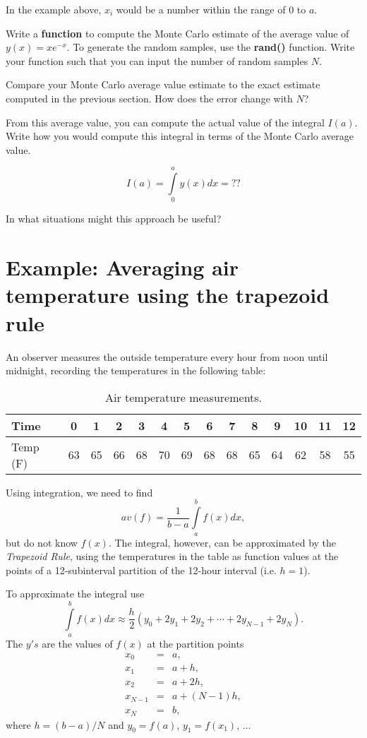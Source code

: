\documentclass[10pt,fleqn]{article}
\begin{document}
In the example above, $x_i$ would be a number within the range of 0 to $a$.

Write a \textbf{function} to compute the Monte Carlo estimate of the average value of $y(x)=xe^{-x}$. To generate the random samples, use the \textbf{rand()} function. Write your function such that you can input the number of random samples $N$.

Compare your Monte Carlo average value estimate to the exact estimate computed in the previous section. How does the error change with $N$?

From this average value, you can compute the actual value of the integral $I(a)$. Write how you would compute this integral in terms of the Monte Carlo average value.

$$I(a) = \int\limits_0^a y(x) dx = ??$$

In what situations might this approach be useful?

\section*{Example: Averaging air temperature using the trapezoid rule}

An observer measures the outside temperature every hour from noon until midnight, recording the temperatures in the following table:

\begin{table}[bh]
	\centering
	\begin{tabular}{l|ccccccccccccc} \hline
	Time & 0 & 1 & 2 & 3 & 4 & 5 & 6 & 7 & 8 & 9 & 10 & 11 & 12 \\ \hline
	Temp (F) & 63 & 65 & 66 & 68 & 70 & 69 & 68 & 68 & 65 & 64 & 62 & 58 & 55 \\ \hline
	\end{tabular}
	\caption{Air temperature measurements.}
	\label{tab:airtemp}
\end{table}

Using integration, we need to find $$av(f) = \frac{1}{b-a} \int \limits_a^b f(x) dx,$$ but do not know $f(x)$. The integral, however, can be approximated by the \textit{Trapezoid Rule}, using the temperatures in the table as function values at the points of a 12-subinterval partition of the 12-hour interval (i.e. $h=1$).

To approximate the integral use $$\int \limits_a^b f(x) dx \approx \frac{h}{2}\left(y_0 + 2y_1 + 2y_2 + \cdots + 2y_{N-1} + 2y_N \right).$$ The $y's$ are the values of $f(x)$ at the partition points
\begin{eqnarray} \nonumber
x_0 &=& a, \\ \nonumber
x_1 &=& a+h, \\ \nonumber
x_2 &=& a+2h, \\ \nonumber
x_{N-1} &=& a+(N-1)h, \\ \nonumber
x_{N} &=& b,
\label{eqn:partition}
\end{eqnarray}
where $h=(b-a)/N$ and $y_0=f(a)$, $y_1=f(x_1)$, $\ldots$
\end{document}
